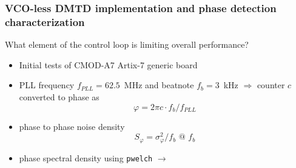\documentclass[compress,10pt,aspectratio=169]{beamer}
\begin{document}
\begin{frame}[fragile]\frametitle{VCO-less DMTD implementation and phase detection characterization}

What element of the control loop is limiting overall performance?

\vspace{0.3cm}
\begin{minipage}[t]{1.06\linewidth}
\begin{minipage}{.49\linewidth}


\begin{itemize}
\item Initial tests of CMOD-A7 Artix-7 generic board
\item PLL frequency $f_{PLL}=62.5$~MHz and beatnote $f_b=3$~kHz $\Rightarrow$ counter $c$ converted
to phase as $$\varphi=2\pi c\cdot f_b/f_{PLL}$$
\item phase to phase noise density $$S_\varphi=\sigma^2_\varphi/f_b\mbox{ @ }f_b$$
\item phase spectral density using {\tt pwelch} $\longrightarrow$
\end{itemize}
\end{minipage}
\begin{minipage}{.49\linewidth}
\vspace{0.6cm}


\end{minipage}
\end{minipage}
\end{frame}
\end{document}
